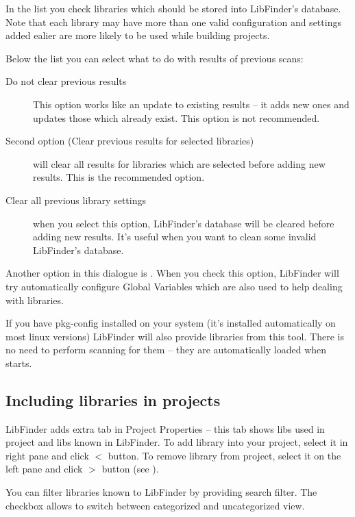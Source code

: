 
In the list you check libraries which should be stored into LibFinder's database. Note that each library may have more than one valid configuration and settings added ealier are more likely to be used while building projects.

Below the list you can select what to do with results of previous scans:

\begin{description}
\item[Do not clear previous results] This option works like an update to existing results -- it adds new ones and updates those which already exist. This option is not recommended.
\item[Second option (Clear previous results for selected libraries)] will clear all results for libraries which are selected before adding new results. This is the recommended option.
\item[Clear all previous library settings] when you select this option, LibFinder's database will be cleared before adding new results. It's useful when you want to clean some invalid LibFinder's database.
\end{description}

Another option in this dialogue is . When you check this option, LibFinder will try automatically configure Global Variables which are also used to help dealing with libraries.

If you have pkg-config installed on your system (it's installed automatically on most linux versions) LibFinder will also provide libraries from this tool. There is no need to perform scanning for them -- they are automatically loaded when \codeblocks starts.

\subsection{Including libraries in projects}

LibFinder adds extra tab in Project Properties  -- this tab shows libs used in project and libs known in LibFinder. To add library into your project, select it in right pane and click $<$ button. To remove library from project, select it on the left pane and click $>$ button (see ).


You can filter libraries known to LibFinder by providing search filter. The  checkbox allows to switch between categorized and uncategorized view.

